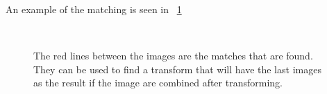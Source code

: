 An example of the matching is seen in ~\ref{fig:bus}
\begin{figure}[!ht]
	\centering
	 \quad 
	\\
	 \quad
	\caption{The red lines between the images are the matches that are found. They can be used to find a transform that will have the last images as the result if the image are combined after transforming.}
	\label{fig:bus}
\end{figure}
